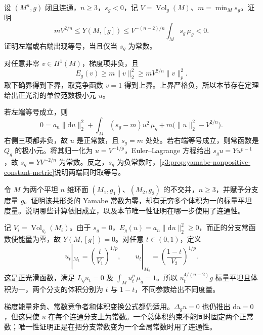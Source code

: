 \begin{exercise}\label{g3:ex:yamabe-negative-curvature-bounds}
	设 \((M^n,g)\) 闭且连通，\(n\ge3\)，\(s_g<0\)，记 \(V=\operatorname{Vol}_g(M)\)、\(m=\min_Ms_g\)。证明
	\[
		mV^{2/n}\le Y(M,[g])
		\le V^{-(n-2)/n}\int_Ms_g\,\mu_g<0.
	\]
	证明左端或右端出现等号，当且仅当 \(s_g\) 为常数。
\end{exercise}
\begin{solution}
	对任意非零 \(v\in H^1(M)\)，梯度项非负，且
	\[
		E_g(v)\ge m\|v\|_2^2
		\ge mV^{2/n}\|v\|_p^2.
	\]
	取下确界得到下界，取竞争函数 \(v=1\) 得到上界。上界严格负，所以本节存在定理给出正光滑的单位范数极小元 \(u\)。

	若左端等号成立，则
	\[
		0=a_n\|\mathrm du\|_2^2
		+\int_M(s_g-m)u^2\,\mu_g
		+m\bigl(\|u\|_2^2-V^{2/n}\bigr).
	\]
	右侧三项都非负，故 \(u\) 是正常数，且 \(s_g=m\) 处处。若右端等号成立，则常函数是 \(Q_g\) 的极小元。将其归一化为 \(u=V^{-1/p}\)，Euler--Lagrange 方程给出 \(s_gu=Yu^{p-1}\)，故 \(s_g=YV^{-2/n}\) 为常数。反之，\(s_g\) 为负常数时，\cref{g3:prop:yamabe-nonpositive-constant-metric}说明两端同时取等号。
\end{solution}

\begin{exercise}\label{g3:ex:yamabe-disconnected-zero-nonuniqueness}
	令 \(M\) 为两个平坦 \(n\) 维环面 \((M_1,g_1)\)、\((M_2,g_2)\) 的不交并，\(n\ge3\)，并赋予分支度量 \(g\)。证明该共形类的 Yamabe 常数为零，却有无穷多个体积为一的标量平坦度量。说明哪些计算依旧成立，以及本节唯一性证明在哪一步使用了连通性。
\end{exercise}
\begin{solution}
	记 \(V_i=\operatorname{Vol}_{g_i}(M_i)\)。由于 \(s_g=0\)，\(E_g(u)=a_n\|\mathrm du\|_2^2\ge0\)，而正的分支常函数使能量为零，故 \(Y(M,[g])=0\)。对任意 \(t\in(0,1)\)，定义
	\[
		u_t|_{M_1}=\left(\frac{t}{V_1}\right)^{1/p},
		\qquad u_t|_{M_2}=\left(\frac{1-t}{V_2}\right)^{1/p}.
	\]
	这是正光滑函数，满足 \(L_gu_t=0\) 及 \(\int_Mu_t^p\,\mu_g=1\)。所以 \(u_t^{4/(n-2)}g\) 标量平坦且体积为一，两个分支的体积分别为 \(t\) 与 \(1-t\)，不同参数给出不同度量。

	梯度能量非负、常数竞争者和体积变换公式都仍适用。\(\Delta_gu=0\) 也仍推出 \(\mathrm du=0\)，但这只使 \(u\) 在每个连通分支上为常数。一个总体积约束不能同时固定两个正常数；唯一性证明正是在把分支常数变为一个全局常数时用了连通性。
\end{solution}

